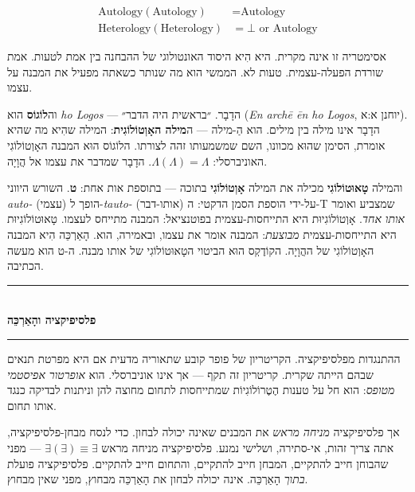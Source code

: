 \documentclass[10pt, openany, oneside]{book}
\renewcommand{\normalsize}{\fontsize{10}{13}\selectfont}
\begin{document}
\begin{align*}
\text{Autology}(\text{Autology}) &= \text{Autology} \\
\text{Heterology}(\text{Heterology}) &= \bot \text{ or } \text{Autology}
\end{align*}

אסימטריה זו אינה מקרית. היא הִיא היסוד האונטולוגי של ההבחנה בין אמת לטעות. אמת שורדת הפעלה-עצמית. טעות לא. הממשי הוא מה שנותר כשאתה מפעיל את המבנה על עצמו.

וה\textbf{לוֹגוֹס} הוא \textit{ho Logos} — הדָבָר. ״בראשית היה הדבר״ (\textit{En archē ēn ho Logos}, יוחנן א:א). הדָבָר אינו מילה בין מילים. הוא הַ-מילה — ה\textbf{מילה האָוְטוֹלוֹגִית}: המילה שהִיא מה שהיא אומרת, הסימן שהוּא מכוונו, השם שמשמעותו זהה לצורתו. הלוֹגוֹס הוּא המבנה האָוְטוֹלוֹגִי האוניברסלי: $\Lambda(\Lambda) = \Lambda$. הדָבָר שמדבר את עצמו אל הֲוָיָה.

והמילה \textbf{טָאוּטוֹלוֹגִי} מכילה את המילה \textbf{אָוְטוֹלוֹגִי} בתוכה — בתוספת אות אחת: \textbf{ט}. השורש היווני \textit{auto-} (עצמי) הופך ל-\textit{tauto-} (אותו-דבר) על-ידי הוספת הסמן הדקטי: ה-T שמצביע ואומר \textit{אותו אחד}. אָוְטוֹלוֹגִיוּת היא התייחסות-עצמית בפוטנציאל: המבנה מתייחס לעצמו. טָאוּטוֹלוֹגִיוּת היא התייחסות-עצמית \textit{מבוצעת}: המבנה אומר את עצמו, ובאמירה, הוא. הָאַרְכֵּה הִיא המבנה האָוְטוֹלוֹגִי של ההֲוָיָה. הקוֹדֶקְס הוּא הביטוי הטָאוּטוֹלוֹגִי של אותו מבנה. ה-ט הוא מעשה הכתיבה.

\vspace{1.5em}


\begin{center}
    \rule{0.3\textwidth}{0.4pt}\\[0.5em]
    {\normalsize\bfseries\textsc{פלסיפיקציה והָאַרְכֵּה}}\\[0.3em]
    \rule{0.3\textwidth}{0.4pt}
\end{center}

\vspace{1em}

\noindent ההתנגדות מפלסיפיקציה. הקריטריון של פופר קובע שתאוריה מדעית אם היא מפרטת תנאים שבהם הייתה שקרית. קריטריון זה תקף — אך אינו אוניברסלי. הוא \textit{אופרטור אפיסטמי מטופס}: הוא חל על טענות הֶטֶרוֹלוֹגִיוֹת שמתייחסות לתחום מחוצה להן וניתנות לבדיקה כנגד אותו תחום.

אך פלסיפיקציה \textit{מניחה מראש} את המבנים שאינה יכולה לבחון. כדי לנסח מבחן-פלסיפיקציה, אתה צריך זהות, אי-סתירה, ושלישי נמנע. פלסיפיקציה מניחה מראש $\exists(\exists) \equiv \exists$ — מפני שהבוחן חייב להתקיים, המבחן חייב להתקיים, והתחום חייב להתקיים. פלסיפיקציה פועלת \textit{בתוך} הָאַרְכֵּה. אינה יכולה לבחון את הָאַרְכֵּה מבחוץ, מפני שאין מבחוץ.
\end{document}
